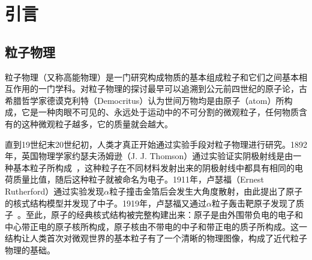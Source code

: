 
\chapter{引言}
\label{cha:intro}

\section{粒子物理} 
粒子物理（又称高能物理）是一门研究构成物质的基本组成粒子和它们之间基本相互作用的一门学科。对粒子物理的探讨最早可以追溯到公元前四世纪的原子论，古希腊哲学家德谟克利特（Democritus）认为世间万物均是由原子（atom）所构成，它是一种肉眼不可见的、永远处于运动中的不可分割的微观粒子，任何物质含有的这种微观粒子越多，它的质量就会越大。

直到19世纪末20世纪初，人类才真正开始通过实验手段对粒子物理进行研究。1892年，英国物理学家约瑟夫汤姆逊（J. J. Thomson）通过实验证实阴极射线是由一种基本粒子所构成~\cite{electron}，这种粒子在不同材料发射出来的阴极射线中都具有相同的电荷质量比值，随后这种粒子就被命名为电子。1911年，卢瑟福（Ernest Rutherford）通过实验发现$\alpha$粒子撞击金箔后会发生大角度散射，由此提出了原子的核式结构模型并发现了中子。1919年，卢瑟福又通过$\alpha$粒子轰击靶原子发现了质子~\cite{proton}。至此，原子的经典核式结构被完整构建出来：原子是由外围带负电的电子和中心带正电的原子核所构成，原子核由不带电的中子和带正电的质子所构成。这一结构让人类首次对微观世界的基本粒子有了一个清晰的物理图像，构成了近代粒子物理的基础。

